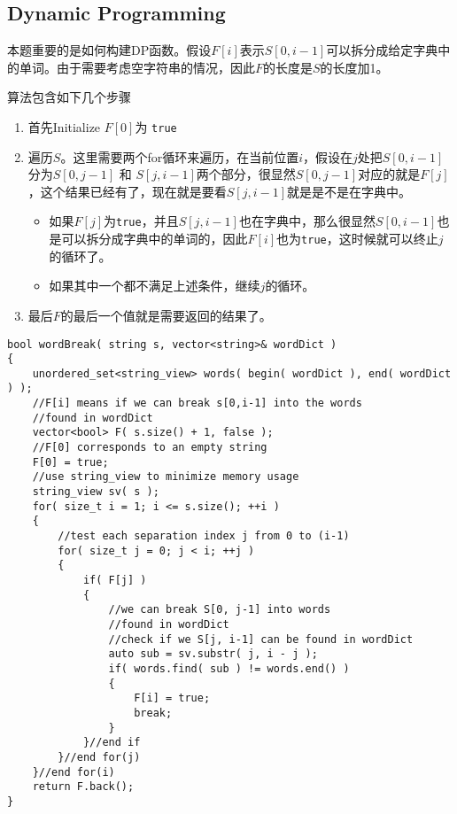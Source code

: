 \subsection{Dynamic Programming}
本题重要的是如何构建DP函数。假设$F[i]$表示$S[0,i-1]$可以拆分成给定字典中的单词。由于需要考虑空字符串的情况，因此$F$的长度是$S$的长度加1。
\par
算法包含如下几个步骤
\begin{enumerate}
    \item 首先Initialize $F[0]$为 \texttt{true}
    \item 遍历$S$。这里需要两个for循环来遍历，在当前位置$i$，假设在$j$处把$S[0,i-1]$分为$S[0, j-1]$ 和 $S[j, i-1]$两个部分，很显然$S[0,j-1]$对应的就是$F[j]$，这个结果已经有了，现在就是要看$S[j,i-1]$就是是不是在字典中。
    \begin{itemize}
        \item 如果$F[j]$为\texttt{true}，并且$S[j,i-1]$也在字典中，那么很显然$S[0,i-1]$也是可以拆分成字典中的单词的，因此$F[i]$也为\texttt{true}，这时候就可以终止$j$的循环了。
        \item 如果其中一个都不满足上述条件，继续$j$的循环。
    \end{itemize}
    \item 最后$F$的最后一个值就是需要返回的结果了。
\end{enumerate}


\setcounter{lstlisting}{0}
\begin{lstlisting}[style=customc, caption={DP}]
bool wordBreak( string s, vector<string>& wordDict )
{
    unordered_set<string_view> words( begin( wordDict ), end( wordDict ) );
    //F[i] means if we can break s[0,i-1] into the words
    //found in wordDict
    vector<bool> F( s.size() + 1, false );
    //F[0] corresponds to an empty string
    F[0] = true;
    //use string_view to minimize memory usage
    string_view sv( s );
    for( size_t i = 1; i <= s.size(); ++i )
    {
        //test each separation index j from 0 to (i-1)
        for( size_t j = 0; j < i; ++j )
        {
            if( F[j] )
            {
                //we can break S[0, j-1] into words
                //found in wordDict
                //check if we S[j, i-1] can be found in wordDict
                auto sub = sv.substr( j, i - j );
                if( words.find( sub ) != words.end() )
                {
                    F[i] = true;
                    break;
                }
            }//end if
        }//end for(j)
    }//end for(i)
    return F.back();
}
\end{lstlisting}

